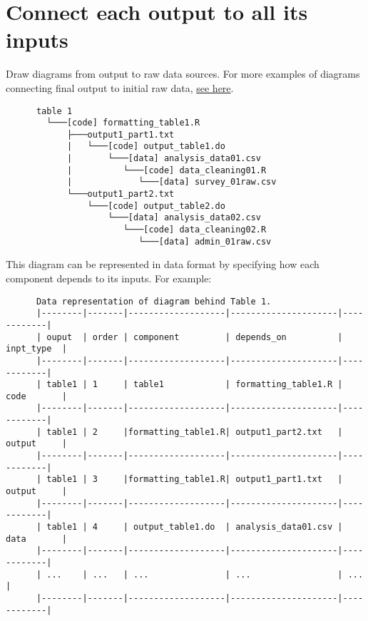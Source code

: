 \documentclass[]{book}
\begin{document}
\hypertarget{connect-each-output-to-all-its-inputs}{%
\section{Connect each output to all its inputs}\label{connect-each-output-to-all-its-inputs}}

Draw diagrams from output to raw data sources. For more examples of diagrams connecting final output to initial raw data, \protect\hyperlink{additional-diagrams}{see here}.

\begin{verbatim}
      table 1
        └───[code] formatting_table1.R
            ├───output1_part1.txt  
            |   └───[code] output_table1.do           
            |       └───[data] analysis_data01.csv
            |          └───[code] data_cleaning01.R
            |             └───[data] survey_01raw.csv
            └───output1_part2.txt  
                └───[code] output_table2.do           
                    └───[data] analysis_data02.csv
                       └───[code] data_cleaning02.R
                          └───[data] admin_01raw.csv  
\end{verbatim}

This diagram can be represented in data format by specifying how each component depends to its inputs. For example:

\begin{verbatim}
      Data representation of diagram behind Table 1.
      |--------|-------|-------------------|---------------------|------------|
      | ouput  | order | component         | depends_on          | inpt_type  |
      |--------|-------|-------------------|---------------------|------------|
      | table1 | 1     | table1            | formatting_table1.R | code       |
      |--------|-------|-------------------|---------------------|------------|
      | table1 | 2     |formatting_table1.R| output1_part2.txt   | output     |
      |--------|-------|-------------------|---------------------|------------|
      | table1 | 3     |formatting_table1.R| output1_part1.txt   | output     |
      |--------|-------|-------------------|---------------------|------------|
      | table1 | 4     | output_table1.do  | analysis_data01.csv | data       |
      |--------|-------|-------------------|---------------------|------------|
      | ...    | ...   | ...               | ...                 | ...        |
      |--------|-------|-------------------|---------------------|------------|
\end{verbatim}
\end{document}
